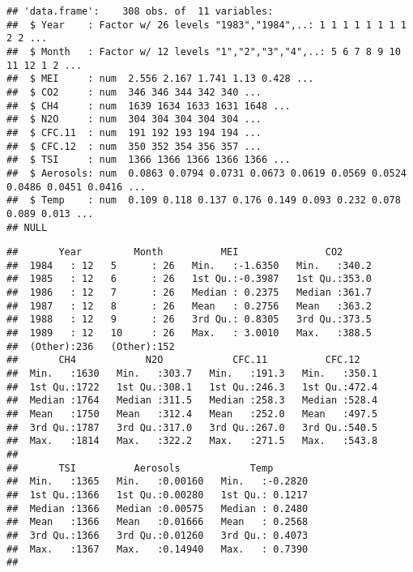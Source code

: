 \documentclass[]{article}
\begin{document}
\begin{verbatim}
## 'data.frame':    308 obs. of  11 variables:
##  $ Year    : Factor w/ 26 levels "1983","1984",..: 1 1 1 1 1 1 1 1 2 2 ...
##  $ Month   : Factor w/ 12 levels "1","2","3","4",..: 5 6 7 8 9 10 11 12 1 2 ...
##  $ MEI     : num  2.556 2.167 1.741 1.13 0.428 ...
##  $ CO2     : num  346 346 344 342 340 ...
##  $ CH4     : num  1639 1634 1633 1631 1648 ...
##  $ N2O     : num  304 304 304 304 304 ...
##  $ CFC.11  : num  191 192 193 194 194 ...
##  $ CFC.12  : num  350 352 354 356 357 ...
##  $ TSI     : num  1366 1366 1366 1366 1366 ...
##  $ Aerosols: num  0.0863 0.0794 0.0731 0.0673 0.0619 0.0569 0.0524 0.0486 0.0451 0.0416 ...
##  $ Temp    : num  0.109 0.118 0.137 0.176 0.149 0.093 0.232 0.078 0.089 0.013 ...
## NULL
\end{verbatim}

\begin{verbatim}
##       Year         Month          MEI               CO2       
##  1984   : 12   5      : 26   Min.   :-1.6350   Min.   :340.2  
##  1985   : 12   6      : 26   1st Qu.:-0.3987   1st Qu.:353.0  
##  1986   : 12   7      : 26   Median : 0.2375   Median :361.7  
##  1987   : 12   8      : 26   Mean   : 0.2756   Mean   :363.2  
##  1988   : 12   9      : 26   3rd Qu.: 0.8305   3rd Qu.:373.5  
##  1989   : 12   10     : 26   Max.   : 3.0010   Max.   :388.5  
##  (Other):236   (Other):152                                    
##       CH4            N2O            CFC.11          CFC.12     
##  Min.   :1630   Min.   :303.7   Min.   :191.3   Min.   :350.1  
##  1st Qu.:1722   1st Qu.:308.1   1st Qu.:246.3   1st Qu.:472.4  
##  Median :1764   Median :311.5   Median :258.3   Median :528.4  
##  Mean   :1750   Mean   :312.4   Mean   :252.0   Mean   :497.5  
##  3rd Qu.:1787   3rd Qu.:317.0   3rd Qu.:267.0   3rd Qu.:540.5  
##  Max.   :1814   Max.   :322.2   Max.   :271.5   Max.   :543.8  
##                                                                
##       TSI          Aerosols            Temp        
##  Min.   :1365   Min.   :0.00160   Min.   :-0.2820  
##  1st Qu.:1366   1st Qu.:0.00280   1st Qu.: 0.1217  
##  Median :1366   Median :0.00575   Median : 0.2480  
##  Mean   :1366   Mean   :0.01666   Mean   : 0.2568  
##  3rd Qu.:1366   3rd Qu.:0.01260   3rd Qu.: 0.4073  
##  Max.   :1367   Max.   :0.14940   Max.   : 0.7390  
## 
\end{verbatim}
\end{document}
